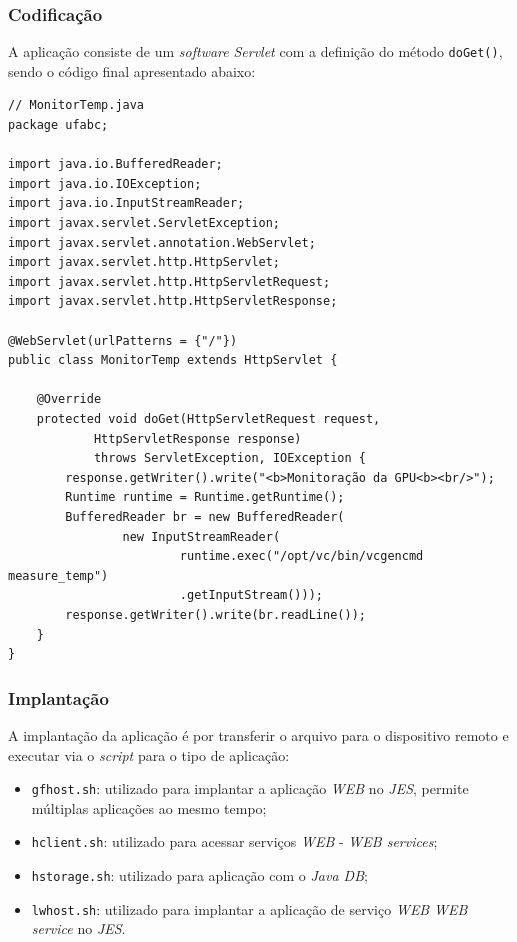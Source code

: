 \subsubsection{Codificação}

A aplicação consiste de um \textit{software} \textit{Servlet} com a definição
do método \verb|doGet()|, sendo o código final apresentado abaixo:

\begin{verbatim}
// MonitorTemp.java
package ufabc;

import java.io.BufferedReader;
import java.io.IOException;
import java.io.InputStreamReader;
import javax.servlet.ServletException;
import javax.servlet.annotation.WebServlet;
import javax.servlet.http.HttpServlet;
import javax.servlet.http.HttpServletRequest;
import javax.servlet.http.HttpServletResponse;

@WebServlet(urlPatterns = {"/"})
public class MonitorTemp extends HttpServlet {

    @Override
    protected void doGet(HttpServletRequest request,
            HttpServletResponse response)
            throws ServletException, IOException {
        response.getWriter().write("<b>Monitoração da GPU<b><br/>");
        Runtime runtime = Runtime.getRuntime();
        BufferedReader br = new BufferedReader(
                new InputStreamReader(
                        runtime.exec("/opt/vc/bin/vcgencmd measure_temp")
                        .getInputStream()));
        response.getWriter().write(br.readLine());
    }
}
\end{verbatim}

\subsubsection{Implantação}

A implantação da aplicação é por transferir o arquivo para o dispositivo remoto
e executar via o \textit{script} para o tipo de aplicação:

\begin{itemize}

    \item \verb|gfhost.sh|: utilizado para implantar a aplicação \textit{WEB}
    no \textit{JES}, permite múltiplas aplicações ao mesmo tempo;

    \item \verb|hclient.sh|: utilizado para acessar serviços \textit{WEB} -
    \textit{WEB services};

    \item \verb|hstorage.sh|: utilizado para aplicação com o \textit{Java DB};

    \item \verb|lwhost.sh|: utilizado para implantar a aplicação de serviço
      \textit{WEB} \textit{WEB service} no \textit{JES}.

\end{itemize}

